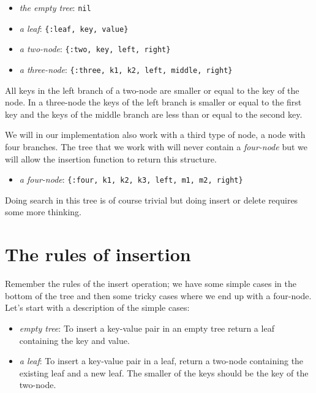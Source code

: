 \documentclass[a4paper,11pt]{article}
\begin{document}
\begin{itemize}
    \item {\em the empty tree}: {\tt nil}
    \item {\em a leaf}: {\tt \{:leaf, key, value\}}
    \item {\em a two-node}: {\tt \{:two, key, left, right\}}
    \item {\em a three-node}: {\tt \{:three, k1, k2, left, middle, right\}}
\end{itemize}

All keys in the left branch of a two-node are smaller or equal to the
key of the node. In a three-node the keys of the left branch is
smaller or equal to the first key and the keys of the middle branch are
less than or equal to the second key.

We will in our implementation also work with a third type of node, a
node with four branches. The tree that we work with will never contain
a {\em four-node} but we will allow the insertion function to return
this structure.

\begin{itemize}
    \item {\em a four-node}: {\tt \{:four, k1, k2, k3, left, m1, m2, right\}}
\end{itemize}

Doing search in this tree is of course trivial but doing insert or
delete requires some more thinking.



\section{The rules of insertion}

Remember the rules of the insert operation; we have some simple cases
in the bottom of the tree and then some tricky cases where we end up
with a four-node. Let's start with a description of the simple cases:

\begin{itemize}
    \item {\em empty tree}: To insert a key-value pair in an empty tree return a leaf containing the key and value.
    \item {\em a leaf}: To insert a key-value pair in a leaf, return a
    two-node containing the existing leaf and a new leaf. The smaller
    of the keys should be the key of the two-node.
\end{itemize}
\end{document}
